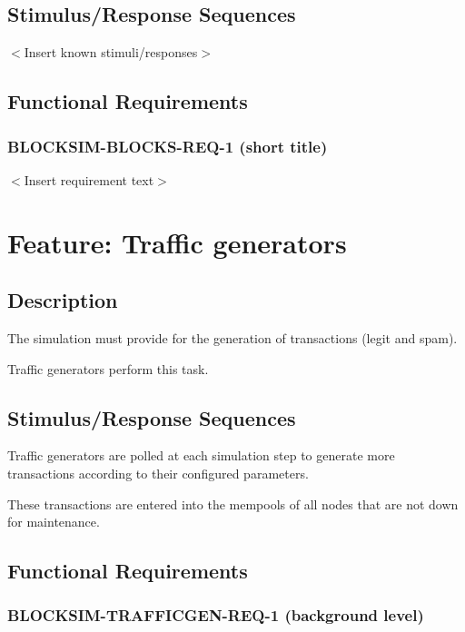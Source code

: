 \documentclass{scrreprt}
\begin{document}
\subsection{Stimulus/Response Sequences}

$<$Insert known stimuli/responses$>$


\subsection{Functional Requirements}

\subsubsection{BLOCKSIM-BLOCKS-REQ-1 (short title)}

$<$Insert requirement text$>$





\section{Feature: Traffic generators}

\subsection{Description}

The simulation must provide for the generation of transactions (legit and spam).

Traffic generators perform this task.


\subsection{Stimulus/Response Sequences}

Traffic generators are polled at each simulation step to generate more
transactions according to their configured parameters.

These transactions are entered into the mempools of all nodes that are not
down for maintenance.


\subsection{Functional Requirements}

\subsubsection{BLOCKSIM-TRAFFICGEN-REQ-1 (background level)}
\end{document}
